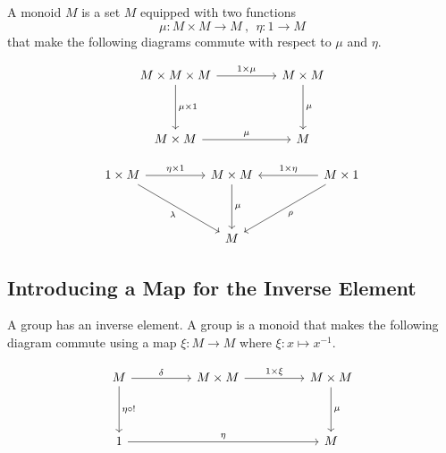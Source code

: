 \documentclass[uplatex,a4j,12pt,dvipdfmx]{jsarticle}
\begin{document}
A monoid $M$ is a set $M$ equipped with two functions
$$
	\mu : M \times M \to M \ , \ \ \eta : 1 \to M
$$
that make the following diagrams commute with respect to $\mu$ and $\eta$.

\[
	\begin{tikzcd}
		M \times M \times M \arrow[rr, "1 \times \mu"] \arrow[dd, "\mu \times 1"] &  & M \times M \arrow[dd, "\mu"] \\
		&  &                               \\
		M \times M \arrow[rr, "\mu"]                                                 &  & M
	\end{tikzcd}
\]

\[
	\begin{tikzcd}
		1 \times M \arrow[rr, "\eta \times 1"] \arrow[rrdd, "\lambda"'] &  & M \times M \arrow[dd, "\mu"] &  & M \times 1 \arrow[ll, "1 \times \eta"'] \arrow[lldd, "\rho"] \\
		&  &                               &  &                                                               \\
		&  & M                              &  &
	\end{tikzcd}
\]

\subsection{Introducing a Map for the Inverse Element}


A group has an inverse element.
A group is a monoid that makes the following diagram commute using a map $\xi : M \to M$ where $\xi : x \mapsto x^{-1}$.

\[
	\begin{tikzcd}
		M \arrow[dd, "\eta \circ !"] \arrow[rr, "\delta"] &  & M \times M \arrow[rr, "1 \times \xi"] &  & M \times M \arrow[dd, "\mu"] \\
		&  &                                        &  &                              \\
		1 \arrow[rrrr, "\eta"]                               &  &                                        &  & M
	\end{tikzcd}
\]
\end{document}
